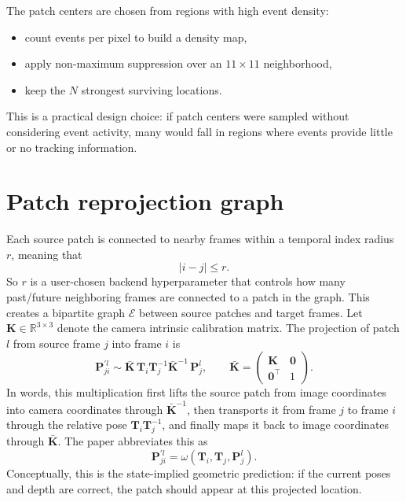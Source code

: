 \documentclass[11pt]{article}
\newcommand{\R}{\mathbb{R}}
\newcommand{\T}{^{\top}}
\begin{document}
The patch centers are chosen from regions with high event density:
\begin{itemize}
    \item count events per pixel to build a density map,
    \item apply non-maximum suppression over an \(11\times 11\) neighborhood,
    \item keep the \(N\) strongest surviving locations.
\end{itemize}
This is a practical design choice: if patch centers were sampled without considering event activity, many would fall in regions where events provide little or no tracking information.

\section{Patch reprojection graph}

Each source patch is connected to nearby frames within a temporal index radius \(r\), meaning that
\begin{equation}
|i-j|\le r.
\end{equation}
So \(r\) is a user-chosen backend hyperparameter that controls how many past/future neighboring frames are connected to a patch in the graph.
This creates a bipartite graph \(\mathcal{E}\) between source patches and target frames.
Let \(\mathbf{K}\in\R^{3\times 3}\) denote the camera intrinsic calibration matrix.
The projection of patch \(l\) from source frame \(j\) into frame \(i\) is
\begin{equation}
\mathbf{P}_{ji}^{\prime l}
\sim
\bar{\mathbf{K}}\,\mathbf{T}_i\mathbf{T}_j^{-1}\bar{\mathbf{K}}^{-1}\,\mathbf{P}_j^l,
\qquad
\bar{\mathbf{K}}=
\begin{pmatrix}
\mathbf{K} & \mathbf{0}\\
\mathbf{0}\T & 1
\end{pmatrix}.
\end{equation}
In words, this multiplication first lifts the source patch from image coordinates into camera coordinates through \(\bar{\mathbf{K}}^{-1}\), then transports it from frame \(j\) to frame \(i\) through the relative pose \(\mathbf{T}_i\mathbf{T}_j^{-1}\), and finally maps it back to image coordinates through \(\bar{\mathbf{K}}\).
The paper abbreviates this as
\begin{equation}
\mathbf{P}_{ji}^{\prime l} = \omega(\mathbf{T}_i,\mathbf{T}_j,\mathbf{P}_j^l).
\end{equation}
Conceptually, this is the state-implied geometric prediction: if the current poses and depth are correct, the patch should appear at this projected location.
\end{document}
